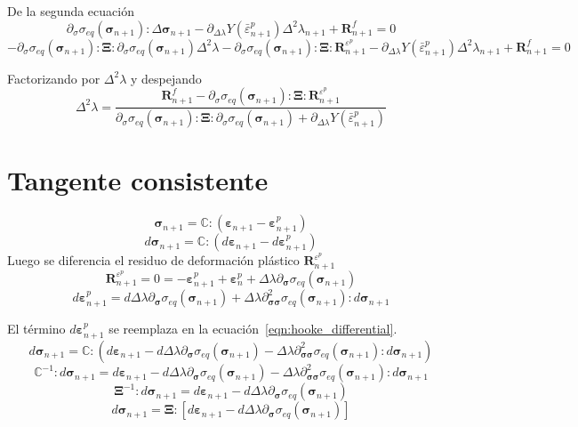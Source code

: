 \documentclass[12pt]{article}
\begin{document}
De la segunda ecuación
\[ \partial_{\sigma}\sigma_{eq}\left(\pmb{\sigma}_{n+1}\right):\Delta\pmb{\sigma}_{n+1} - \partial_{\Delta\lambda}Y\left(\bar\varepsilon^p_{n+1}\right)\Delta^2\lambda_{n+1} + \pmb{R}_{n+1}^{f} = 0\]
\[ -\partial_{\sigma}\sigma_{eq}\left(\pmb{\sigma}_{n+1}\right):\pmb{\Xi}:\partial_{\sigma}\sigma_{eq}\left(\pmb{\sigma}_{n+1}\right)\Delta^2\lambda
   -\partial_{\sigma}\sigma_{eq}\left(\pmb{\sigma}_{n+1}\right):\pmb{\Xi}:\pmb{R}_{n+1}^{\varepsilon^p} 
   - \partial_{\Delta\lambda}Y\left(\bar\varepsilon^p_{n+1}\right)\Delta^2\lambda_{n+1} + \pmb{R}_{n+1}^{f} = 0\]

Factorizando por $\Delta^2\lambda$ y despejando
\[
\Delta^2\lambda = \frac{\pmb{R}_{n+1}^{f} - \partial_{\sigma}\sigma_{eq}\left(\pmb{\sigma}_{n+1}\right):\pmb{\Xi}:\pmb{R}_{n+1}^{\varepsilon^p}}
{\partial_{\sigma}\sigma_{eq}\left(\pmb{\sigma}_{n+1}\right):\pmb{\Xi}:\partial_{\sigma}\sigma_{eq}\left(\pmb{\sigma}_{n+1}\right) + \partial_{\Delta\lambda}Y\left(\bar\varepsilon^p_{n+1}\right)}
\]


\section*{Tangente consistente}
\[\pmb{\sigma}_{n+1} = \mathbb{C}:\left(\pmb{\varepsilon}_{n+1} - \pmb{\varepsilon}_{n+1}^p\right) \]
\begin{equation} \label{eqn:hooke_differential}
    d\pmb{\sigma}_{n+1} = \mathbb{C}:\left(d\pmb{\varepsilon}_{n+1} - d\pmb{\varepsilon}_{n+1}^p\right)
\end{equation}
Luego se diferencia el residuo de deformación plástico $\pmb{R}_{n+1}^{\varepsilon^p}$
\[\pmb{R}_{n+1}^{\varepsilon^p} = 0 = -\pmb{\varepsilon}_{n+1}^p + \pmb{\varepsilon}_{n}^p + \Delta\lambda\partial_{\pmb{\sigma}}\sigma_{eq}\left(\pmb{\sigma}_{n+1}\right) \]
\[d\pmb{\varepsilon}_{n+1}^p = d\Delta\lambda\partial_{\pmb{\sigma}}\sigma_{eq}\left(\pmb{\sigma}_{n+1}\right) + \Delta\lambda\partial_{\pmb{\sigma}\pmb{\sigma}}^2 \sigma_{eq}\left(\pmb{\sigma}_{n+1}\right) : d\pmb{\sigma}_{n+1} \]

El término $d\pmb{\varepsilon}_{n+1}^p$ se reemplaza en la ecuación~\ref{eqn:hooke_differential}. 
\[d\pmb{\sigma}_{n+1} = \mathbb{C}:\left(d\pmb{\varepsilon}_{n+1} - d\Delta\lambda\partial_{\pmb{\sigma}}\sigma_{eq}\left(\pmb{\sigma}_{n+1}\right) - \Delta\lambda\partial_{\pmb{\sigma}\pmb{\sigma}}^2 \sigma_{eq}\left(\pmb{\sigma}_{n+1}\right) : d\pmb{\sigma}_{n+1}\right)\]
\[\mathbb{C}^{-1}:d\pmb{\sigma}_{n+1} = d\pmb{\varepsilon}_{n+1} - d\Delta\lambda\partial_{\pmb{\sigma}}\sigma_{eq}\left(\pmb{\sigma}_{n+1}\right) - \Delta\lambda\partial_{\pmb{\sigma}\pmb{\sigma}}^2 \sigma_{eq}\left(\pmb{\sigma}_{n+1}\right) : d\pmb{\sigma}_{n+1}\]
\[\pmb{\Xi}^{-1}:d\pmb{\sigma}_{n+1} = d\pmb{\varepsilon}_{n+1} - d\Delta\lambda\partial_{\pmb{\sigma}}\sigma_{eq}\left(\pmb{\sigma}_{n+1}\right)\]
\[d\pmb{\sigma}_{n+1} = \pmb{\Xi}:\left[d\pmb{\varepsilon}_{n+1} - d\Delta\lambda\partial_{\pmb{\sigma}}\sigma_{eq}\left(\pmb{\sigma}_{n+1}\right)\right]\]
\end{document}
